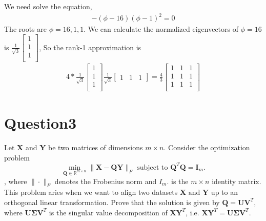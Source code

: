 \documentclass{article}
\newcommand{\R}{\mathbb{R}}
\begin{document}
We need solve the equation, 
\begin{align*}
    -(\phi - 16)(\phi - 1)^2 = 0
\end{align*}
The roots are \(\phi = 16, 1, 1\). 
We can calculate the normalized eigenvectors of \(\phi = 16\) is \(\frac{1}{\sqrt{3}}\begin{bmatrix}
    1 \\
    1 \\
    1 \\
\end{bmatrix}\),
So the rank-1 approximation is
\begin{align*}
    4 * \frac{1}{\sqrt{3}} \begin{bmatrix}
       1 \\ 
       1 \\ 
       1 \\ 
    \end{bmatrix} \frac{1}{\sqrt{3}} \begin{bmatrix}
        1 & 1 & 1
    \end{bmatrix} = \frac{4}{3} \begin{bmatrix}
        1 & 1 & 1 \\
        1 & 1 & 1 \\
        1 & 1 & 1 \\
    \end{bmatrix}
\end{align*}




\section*{Question3}
Let \(\bm{X}\) and \(\bm{Y}\) be two matrices of dimensions \(m \times n\). Consider the optimization problem \[
    \min_{\bm{Q}\in\R^{m\times n}} \|\bm{X} - \bm{QY}\|_F \text{ subject to } \bm{Q}^T\bm{Q} = \bm{I}_m.
\],
where \(\|\cdot\|_F\) denotes the Frobenius norm and \(I_m\). is the \(m \times n\) identity matrix. This problem aries when we want to align two datasets \(\bm{X} \text{ and }\bm{Y}\) up to an orthogonal linear transformation. Prove that the solution is given by \(\bm{Q} = \bm{U}\bm{V}^T\), where \(\bm{U}\bm{\Sigma}\bm{V}^T\) is the singular value decomposition of \(\bm{XY}^T\), i.e. \(\bm{X}\bm{Y}^T = \bm{U}\bm{\Sigma}\bm{V}^T\).
\end{document}
